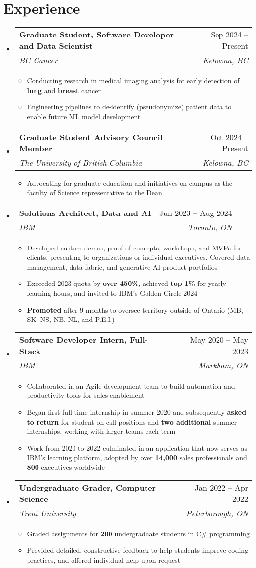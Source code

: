 \documentclass[letterpaper,10pt]{article}
\makeatletter
\newcommand{\resumeItem}[1]{
  \item\small{
    {#1 \vspace{-2pt}}
  }
}
\newcommand{\resumeSubheading}[4]{
  \vspace{-0.9pt}\item
    \begin{tabular*}{0.97\textwidth}[t]{l@{\extracolsep{\fill}}r}
      \textbf{\small#1} & \small#2 \\
      \textit{\small#3} & \textit{\small #4} \\
    \end{tabular*}\vspace{-7pt}
}
\newcommand{\resumeSubHeadingListStart}{\begin{itemize}[leftmargin=0.15in, label={}]}
\newcommand{\resumeSubHeadingListEnd}{\end{itemize}}
\newcommand{\resumeItemListStart}{\begin{itemize}}
\newcommand{\resumeItemListEnd}{\end{itemize}\vspace{-5pt}}
\makeatother
\begin{document}
\section{Experience}
  \resumeSubHeadingListStart
    \resumeSubheading
      {Graduate Student, Software Developer and Data Scientist}{Sep 2024 -- Present}
      {BC Cancer}{Kelowna, BC}
      \resumeItemListStart
        \resumeItem{Conducting research in medical imaging analysis for early detection of \textbf{lung} and \textbf{breast} cancer}
        \resumeItem{Engineering pipelines to de-identify (pseudonymize) patient data to enable future ML model development}
      \resumeItemListEnd
    \resumeSubheading
      {Graduate Student Advisory Council Member}{Oct 2024 -- Present}
      {The University of British Columbia}{Kelowna, BC}
      \resumeItemListStart
        \resumeItem{Advocating for graduate education and initiatives on campus as the faculty of Science representative to the Dean}
      \resumeItemListEnd
    \resumeSubheading
      {Solutions Architect, Data and AI}{Jun 2023 -- Aug 2024}
      {IBM}{Toronto, ON}
      \resumeItemListStart
        \resumeItem{Developed custom demos, proof of concepts, workshops, and MVPs for clients, presenting to organizations or individual executives. Covered data management, data fabric, and generative AI product portfolios}
        \resumeItem{Exceeded 2023 quota by \textbf{over 450\%}, achieved \textbf{top 1\%} for yearly learning hours, and invited to IBM's Golden Circle 2024}
        \resumeItem{\textbf{Promoted} after 9 months to oversee territory outside of Ontario (MB, SK, NS, NB, NL, and P.E.I.)}
      \resumeItemListEnd
    \resumeSubheading
      {Software Developer Intern, Full-Stack}{May 2020 -- May 2023}
      {IBM}{Markham, ON}
      \resumeItemListStart
        \resumeItem{Collaborated in an Agile development team to build automation and productivity tools for sales enablement}
        \resumeItem{Began first full-time internship in summer 2020 and subsequently \textbf{asked to return} for student-on-call positions and \textbf{two additional} summer internships, working with larger teams each term}
        \resumeItem{Work from 2020 to 2022 culminated in an application that now serves as IBM's learning platform, adopted by over \textbf{14,000} sales professionals and \textbf{800} executives worldwide}
      \resumeItemListEnd
      \resumeSubheading
      {Undergraduate Grader, Computer Science}{Jan 2022 -- Apr 2022}
      {Trent University}{Peterborough, ON}
      \resumeItemListStart
        \resumeItem{Graded assignments for \textbf{200} undergraduate students in C\# programming}
        \resumeItem{Provided detailed, constructive feedback to help students improve coding practices, and offered individual help upon request}
      \resumeItemListEnd
  \resumeSubHeadingListEnd
\end{document}
